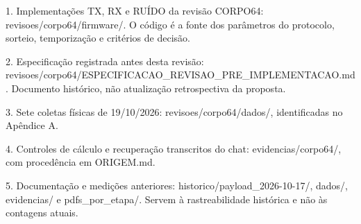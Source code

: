 \documentclass[11pt,a4paper]{article}
\begin{document}
1. Implementações TX, RX e RUÍDO da revisão CORPO64: revisoes/corpo64/firmware/. O código é a fonte dos parâmetros do protocolo, sorteio, temporização e critérios de decisão.


2. Especificação registrada antes desta revisão: revisoes/corpo64/ESPECIFICACAO\_REVISAO\_PRE\_IMPLEMENTACAO.md. Documento histórico, não atualização retrospectiva da proposta.


3. Sete coletas físicas de 19/10/2026: revisoes/corpo64/dados/, identificadas no Apêndice A.


4. Controles de cálculo e recuperação transcritos do chat: evidencias/corpo64/, com procedência em ORIGEM.md.


5. Documentação e medições anteriores: historico/payload\_2026-10-17/, dados/, evidencias/ e pdfs\_por\_etapa/. Servem à rastreabilidade histórica e não às contagens atuais.
\end{document}
